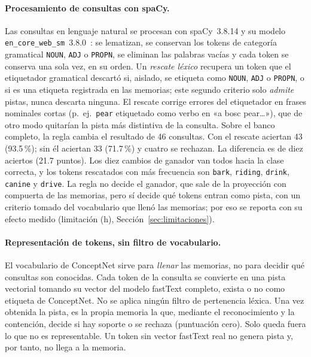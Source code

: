 \paragraph{Procesamiento de consultas con spaCy.}
Las consultas en lenguaje natural se procesan con spaCy~3.8.14 y su modelo
\texttt{en\_core\_web\_sm}~3.8.0~\cite{honnibal2020spacy}: se
lematizan, se conservan los tokens de categoría gramatical \texttt{NOUN}, \texttt{ADJ}
o \texttt{PROPN}, se eliminan las palabras vacías y cada token se conserva una sola vez,
en su orden.
Un \emph{rescate léxico} recupera un token que el etiquetador gramatical
descartó si, aislado, se etiqueta como \texttt{NOUN}, \texttt{ADJ} o \texttt{PROPN}, o
si es una etiqueta registrada en las memorias; este segundo criterio solo \emph{admite}
pistas, nunca descarta ninguna.
El rescate corrige errores del etiquetador en frases nominales cortas (p.\ ej.\
\texttt{pear} etiquetado como verbo en «a bosc pear\ldots»), que de otro modo
quitarían la pista más distintiva de la consulta.
Sobre el banco completo, la regla cambia el resultado de 46 consultas.
Con el rescate aciertan 43 (93.5\,\%); sin él aciertan 33 (71.7\,\%) y cuatro se
rechazan.
La diferencia es de diez aciertos (21.7 puntos).
Los diez cambios de ganador van todos hacia la clase correcta, y los tokens rescatados
con más frecuencia son \texttt{bark}, \texttt{riding}, \texttt{drink}, \texttt{canine}
y \texttt{drive}.
La regla no decide el ganador, que sale de la proyección con compuerta de las memorias, pero
sí decide qué tokens entran como pista, con un criterio tomado del vocabulario que llenó
las memorias; por eso se reporta con su efecto medido (limitación (h),
Sección~\ref{sec:limitaciones}).

\paragraph{Representación de tokens, sin filtro de vocabulario.}
El vocabulario de ConceptNet sirve para \emph{llenar} las memorias, no para decidir qué
consultas son conocidas.
Cada token de la consulta se convierte en una pista vectorial tomando su vector del
modelo fastText completo, exista o no como etiqueta de ConceptNet.
No se aplica ningún filtro de pertenencia léxica. Una vez obtenida la pista, es la
propia memoria la que, mediante el reconocimiento y la contención, decide si
hay soporte o se rechaza (puntuación cero).
Solo queda fuera lo que no es representable. Un token sin vector fastText real no genera
pista y, por tanto, no llega a la memoria.

